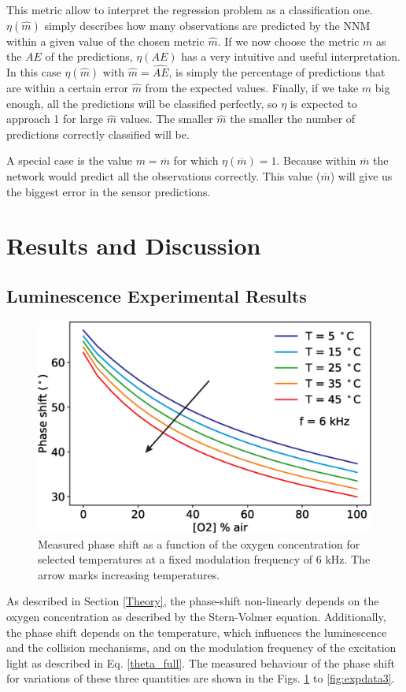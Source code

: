\documentclass[9pt,twocolumn,twoside,pdftex]{optica}
\begin{document}
This metric allow to interpret the regression problem as a classification one. $\eta(\hat m)$ simply describes how many observations are predicted by the NNM within a given value of the chosen metric $\hat m$. If we now choose the metric $m$ as the $AE$ of the predictions, $\eta(AE)$ has a very intuitive and useful interpretation. 
In this case $\eta(\hat{m})$ with $\hat m = \hat{AE}$, is simply the percentage of predictions that are within a certain error $\hat m$ from the expected values. Finally, if we take $\hat m$ big enough, all the predictions will be classified perfectly, so $\eta$ is expected to approach 1 for large $\hat m$ values. The smaller $\hat m$ the smaller the number of predictions correctly classified will be.

A special case is the value $m=\overline{m}$ for which $\eta(\overline{m})=1$. Because within $\overline{m}$ the network would predict all the observations correctly. This value ($\overline{m}$) will give us the biggest error in the sensor predictions.


\section{Results and Discussion}
\label{Results}

\subsection{Luminescence Experimental Results}

\begin{figure}[b!]
\centering
\includegraphics[width=8.2 cm]{phase_O2_T.eps}
\caption{Measured phase shift as a function of the oxygen concentration for selected temperatures at a fixed modulation frequency of 6 kHz. The arrow marks increasing temperatures.}
\label{fig:expdata1}
\end{figure}

As described in Section \ref{Theory}, the phase-shift non-linearly depends on the oxygen concentration as described by the Stern-Volmer equation. Additionally, the phase shift depends on the temperature, which influences the luminescence and the collision mechanisms, and on the modulation frequency of the excitation light as described in Eq. \ref{theta_full}. The measured behaviour of the phase shift for variations of these three quantities are shown in the Figs. \ref{fig:expdata1} to \ref{fig:expdata3}.
\end{document}
